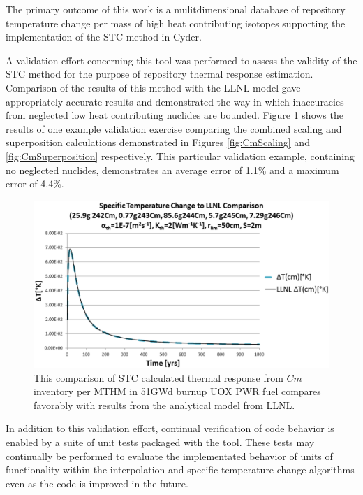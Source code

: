 
The primary outcome of this work is a mulitdimensional database of repository temperature 
change per mass of high heat contributing isotopes supporting the implementation 
of the \gls{STC} method in Cyder. 

A validation effort concerning this tool was performed to assess the validity of 
the \gls{STC} method for the purpose of repository thermal response estimation.  
Comparison of the results of this method with the \gls{LLNL} model 
\cite{greenberg_application_2012} gave 
appropriately accurate results and demonstrated the way in which inaccuracies 
from neglected low heat contributing nuclides are bounded. Figure 
\ref{fig:CmValidation} shows the results of one example validation exercise 
comparing the combined scaling and  superposition calculations demonstrated in 
Figures \ref{fig:CmScaling} and \ref{fig:CmSuperposition} respectively. This 
particular validation example, containing no neglected nuclides, demonstrates 
an average error of 1.1\% and a maximum error of 4.4\%.

\begin{figure}[htp!]
\begin{center}
\includegraphics[width=\columnwidth]{./chapters/methodology/thermal_models/CmValidation.eps}
\end{center}
\caption{This comparison of \gls{STC} calculated thermal response from $Cm$ 
inventory per MTHM in 51GWd burnup UOX PWR fuel compares favorably with results 
from the analytical model from LLNL.} 
\label{fig:CmValidation}
\end{figure}

In addition to this validation effort, continual verification of code behavior
is enabled by a suite of unit tests packaged with the tool. These tests may
continually be performed to evaluate the implementated behavior of units of
functionality within the interpolation and specific temperature change
algorithms even as the code is improved in the future.  
